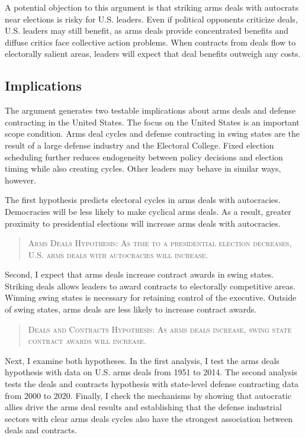 \documentclass[12pt]{article}
\begin{document}
A potential objection to this argument is that striking arms deals with autocrats near elections is risky for U.S. leaders. 
Even if political opponents criticize deals, U.S. leaders may still benefit, as arms deals provide concentrated benefits and diffuse critics face collective action problems.
When contracts from deals flow to electorally salient areas, leaders will expect that deal benefits outweigh any costs. 



\subsection{Implications}


The argument generates two testable implications about arms deals and defense contracting in the United States.  
The focus on the United States is an important scope condition.
Arms deal cycles and defense contracting in swing states are the result of a large defense industry and the Electoral College. 
Fixed election scheduling further reduces endogeneity between policy decisions and election timing while also creating cycles. 
Other leaders may behave in similar ways, however. 


The first hypothesis predicts electoral cycles in arms deals with autocracies.
Democracies will be less likely to make cyclical arms deals. 
As a result, greater proximity to presidential elections will increase arms deals with autocracies. 


\begin{quote}
\textsc{Arms Deals Hypothesis: As time to a presidential election decreases, U.S. arms deals with autocracies will increase.}
\end{quote}


Second, I expect that arms deals increase contract awards in swing states.
Striking deals allows leaders to award contracts to electorally competitive areas. 
Winning swing states is necessary for retaining control of the executive. 
Outside of swing states, arms deals are less likely to increase contract awards. 


\begin{quote}
\textsc{Deals and Contracts Hypothesis: As arms deals increase, swing state contract awards will increase.}
\end{quote}


Next, I examine both hypotheses. 
In the first analysis, I test the arms deals hypothesis with data on U.S. arms deals from 1951 to 2014.  
The second analysis tests the deals and contracts hypothesis with state-level defense contracting data from 2000 to 2020. 
Finally, I check the mechanisms by showing that autocratic allies drive the arms deal results and establishing that the defense industrial sectors with clear arms deals cycles also have the strongest association between deals and contracts. 
\end{document}
